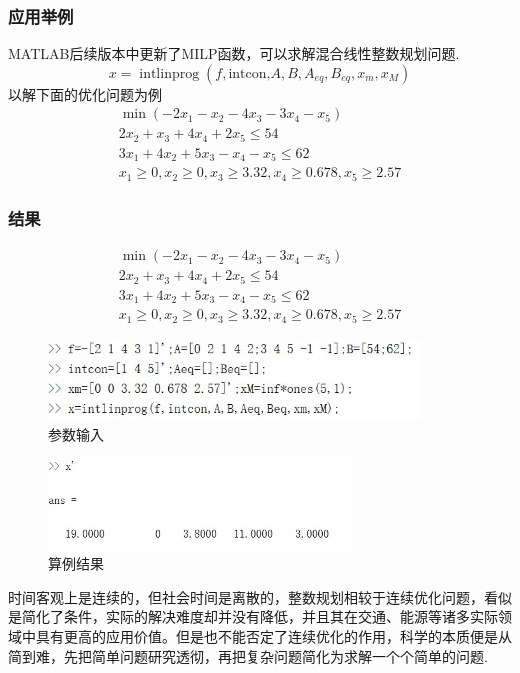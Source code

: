 \documentclass[10pt]{beamer}
\begin{document}
  \begin{frame}[allowframebreaks]
  \frametitle{应用举例}
  
  MATLAB后续版本中更新了MILP函数，可以求解混合线性整数规划问题.
  \begin{equation}
  x=\operatorname{intlinprog}\left(f, \text {intcon,} A, B, A_{e q}, B_{e q}, x_{m}, x_{M}\right)
  \end{equation}
  以解下面的优化问题为例
  \begin{equation}
  \begin{array}{c}
  \min \left(-2 x_{1}-x_{2}-4 x_{3}-3 x_{4}-x_{5}\right) \\
  2 x_{2}+x_{3}+4 x_{4}+2 x_{5} \leq 54 \\
  3 x_{1}+4 x_{2}+5 x_{3}-x_{4}-x_{5} \leq 62 \\
  x_{1} \geq 0, x_{2} \geq 0, x_{3} \geq 3.32, x_{4} \geq 0.678, x_{5} \geq 2.57
  \end{array}
  \end{equation}
  \end{frame}
  
  \begin{frame}[allowframebreaks]
  \frametitle{结果}
  
  \begin{equation}
  \begin{array}{c}
  \min \left(-2 x_{1}-x_{2}-4 x_{3}-3 x_{4}-x_{5}\right) \\
  2 x_{2}+x_{3}+4 x_{4}+2 x_{5} \leq 54 \\
  3 x_{1}+4 x_{2}+5 x_{3}-x_{4}-x_{5} \leq 62 \\
  x_{1} \geq 0, x_{2} \geq 0, x_{3} \geq 3.32, x_{4} \geq 0.678, x_{5} \geq 2.57
  \end{array}
  \end{equation}
  \begin{figure}
  \centering
  \includegraphics[width=0.88\textwidth]{test1.jpg}
  \caption{参数输入}
  \end{figure}
  
  \begin{figure}
  \centering
  \includegraphics[width=0.72\textwidth]{ans1.jpg}
  \caption{算例结果}
  \end{figure}
  时间客观上是连续的，但社会时间是离散的，整数规划相较于连续优化问题，看似是简化了条件，实际的解决难度却并没有降低，并且其在交通、能源等诸多实际领域中具有更高的应用价值。但是也不能否定了连续优化的作用，科学的本质便是从简到难，先把简单问题研究透彻，再把复杂问题简化为求解一个个简单的问题.
  \end{frame}
\end{document}
